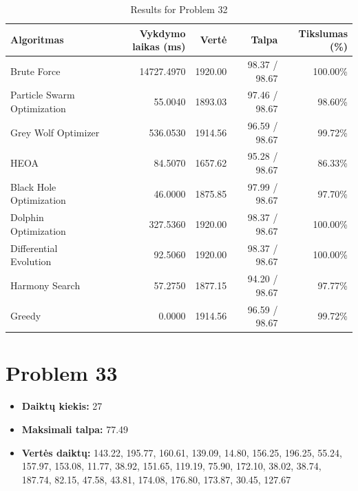 \documentclass[a4paper,11pt]{article}
\begin{document}
\begin{table}[h!]
\centering
\begin{tabular}{lrrrr}
\toprule
\textbf{Algoritmas} & \textbf{Vykdymo laikas (ms)} & \textbf{Vertė} & \textbf{Talpa} & \textbf{Tikslumas (\%)} \\
\midrule
Brute Force & 14727.4970 & 1920.00 & 98.37 / 98.67 & 100.00\% \\
Particle Swarm Optimization & 55.0040 & 1893.03 & 97.46 / 98.67 & 98.60\% \\
Grey Wolf Optimizer & 536.0530 & 1914.56 & 96.59 / 98.67 & 99.72\% \\
HEOA & 84.5070 & 1657.62 & 95.28 / 98.67 & 86.33\% \\
Black Hole Optimization & 46.0000 & 1875.85 & 97.99 / 98.67 & 97.70\% \\
Dolphin Optimization & 327.5360 & 1920.00 & 98.37 / 98.67 & 100.00\% \\
Differential Evolution & 92.5060 & 1920.00 & 98.37 / 98.67 & 100.00\% \\
Harmony Search & 57.2750 & 1877.15 & 94.20 / 98.67 & 97.77\% \\
Greedy & 0.0000 & 1914.56 & 96.59 / 98.67 & 99.72\% \\
\bottomrule
\end{tabular}
\caption{Results for Problem 32}
\end{table}
\clearpage

\section*{Problem 33}
\begin{itemize}
    \item \textbf{Daiktų kiekis:} 27
    \item \textbf{Maksimali talpa:} 77.49
    \item \textbf{Vertės daiktų:} 143.22, 195.77, 160.61, 139.09, 14.80, 156.25, 196.25, 55.24, 157.97, 153.08, 11.77, 38.92, 151.65, 119.19, 75.90, 172.10, 38.02, 38.74, 187.74, 82.15, 47.58, 43.81, 174.08, 176.80, 173.87, 30.45, 127.67
\end{itemize}
\end{document}
